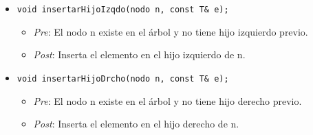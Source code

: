 \begin{itemize}
\begin{itemize}
  \end{itemize}
  \item \verb|void insertarHijoIzqdo(nodo n, const T& e);|
  \begin{itemize}
    \item \textit{Pre}: El nodo n existe en el árbol y no tiene hijo izquierdo previo.
    \item \textit{Post}: Inserta el elemento en el hijo izquierdo de n.
  \end{itemize}
  \item \verb|void insertarHijoDrcho(nodo n, const T& e);|
  \begin{itemize}
    \item \textit{Pre}: El nodo n existe en el árbol y no tiene hijo derecho previo.
    \item \textit{Post}: Inserta el elemento en el hijo derecho de n.
  \end{itemize}
\end{itemize}